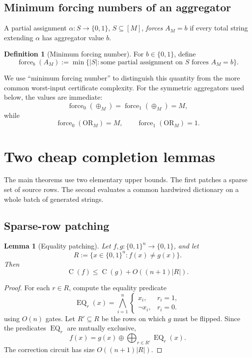 \documentclass[11pt]{article}
\newtheorem{lemma}[theorem]{Lemma}
\theoremstyle{definition}
\newtheorem{definition}[theorem]{Definition}
\newcommand{\bits}{\{0,1\}}
\newcommand{\Ckt}{\operatorname{C}}
\newcommand{\Eq}{\operatorname{EQ}}
\newcommand{\Force}{\operatorname{force}}
\begin{document}
\subsection{Minimum forcing numbers of an aggregator}

A partial assignment $\alpha:S\to\bits$, $S\subseteq[M]$, \emph{forces} $A_M=b$ if every total string extending $\alpha$ has aggregator value $b$.

\begin{definition}[Minimum forcing number]\label{def:forcing}
For $b\in\bits$, define
\[
  \Force_b(A_M)
  :=\min\{|S|:\text{some partial assignment on $S$ forces $A_M=b$}\}.
\]
\end{definition}

We use ``minimum forcing number'' to distinguish this quantity from the more common worst-input certificate complexity.  For the symmetric aggregators used below, the values are immediate:
\[
  \Force_0(\oplus_M)=\Force_1(\oplus_M)=M,
\]
while
\[
  \Force_0(\mathrm{OR}_M)=M,
  \qquad
  \Force_1(\mathrm{OR}_M)=1.
\]

\section{Two cheap completion lemmas}\label{sec:cheap}

The main theorems use two elementary upper bounds.  The first patches a sparse set of source rows.  The second evaluates a common hardwired dictionary on a whole batch of generated strings.

\subsection{Sparse-row patching}

\begin{lemma}[Equality patching]\label{lem:patching}
Let $f,g:\bits^n\to\bits$, and let
\[
  R:=\{x\in\bits^n:f(x)\ne g(x)\}.
\]
Then
\begin{equation}\label{eq:patching}
  \Ckt(f)\le \Ckt(g)+O((n+1)|R|).
\end{equation}
\end{lemma}

\begin{proof}
For each $r\in R$, compute the equality predicate
\[
  \Eq_r(x)=\bigwedge_{i=1}^n
  \begin{cases}
    x_i,&r_i=1,\\
    \neg x_i,&r_i=0.
  \end{cases}
\]
using $O(n)$ gates.  Let $R'\subseteq R$ be the rows on which $g$ must be flipped.  Since the predicates $\Eq_r$ are mutually exclusive,
\[
  f(x)=g(x)\oplus\bigoplus_{r\in R'}\Eq_r(x).
\]
The correction circuit has size $O((n+1)|R|)$.
\end{proof}
\end{document}
